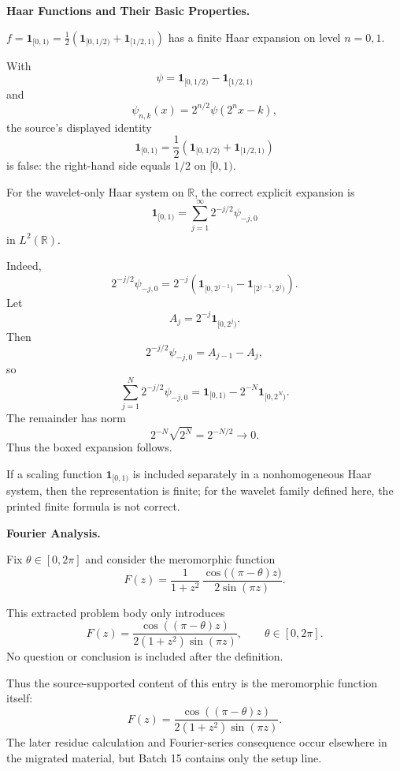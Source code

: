 \begin{problem}[CP-II-0389]
\label{prob:cp-ii-0389}
\textbf{Haar Functions and Their Basic Properties.}

\hspace*{1.5em}$f=\mathbf 1_{[0,1)}=\tfrac12(\mathbf 1_{[0,1/2)}+\mathbf 1_{[1/2,1)})$ has a finite Haar expansion on level $n=0,1$.
\end{problem}

\begin{solution}
With
\[
\psi
=
\mathbf1_{[0,1/2)}
-
\mathbf1_{[1/2,1)}
\]
and
\[
\psi_{n,k}(x)=2^{n/2}\psi(2^nx-k),
\]
the source's displayed identity
\[
\mathbf1_{[0,1)}
=
\frac12
\left(
\mathbf1_{[0,1/2)}
+
\mathbf1_{[1/2,1)}
\right)
\]
is false: the right-hand side equals \(1/2\) on \([0,1)\).

For the wavelet-only Haar system on \(\mathbb R\), the correct explicit expansion is
\[
\boxed{
\mathbf1_{[0,1)}
=
\sum_{j=1}^{\infty}
2^{-j/2}\psi_{-j,0}
}
\]
in \(L^2(\mathbb R)\).

Indeed,
\[
2^{-j/2}\psi_{-j,0}
=
2^{-j}
\left(
\mathbf1_{[0,2^{j-1})}
-
\mathbf1_{[2^{j-1},2^j)}
\right).
\]
Let
\[
A_j=2^{-j}\mathbf1_{[0,2^j)}.
\]
Then
\[
2^{-j/2}\psi_{-j,0}=A_{j-1}-A_j,
\]
so
\[
\sum_{j=1}^{N}2^{-j/2}\psi_{-j,0}
=
\mathbf1_{[0,1)}
-
2^{-N}\mathbf1_{[0,2^N)}.
\]
The remainder has norm
\[
2^{-N}\sqrt{2^N}=2^{-N/2}\to0.
\]
Thus the boxed expansion follows.

If a scaling function \(\mathbf1_{[0,1)}\) is included separately in a nonhomogeneous Haar
system, then the representation is finite; for the wavelet family defined here, the printed
finite formula is not correct.
\end{solution}


\begin{problem}[CP-II-0390]
\label{prob:cp-ii-0390}
\textbf{Fourier Analysis.}

\hspace*{1.5em}Fix $\theta\in[0,2\pi]$ and consider the meromorphic function
\[
F(z) = \frac{1}{1+z^2}\,\frac{\cos\bigl((\pi-\theta)z\bigr)}{2\sin(\pi z)}.
\]
\end{problem}

\begin{solution}
This extracted problem body only introduces
\[
F(z)
=
\frac{\cos((\pi-\theta)z)}
{2(1+z^2)\sin(\pi z)},
\qquad
\theta\in[0,2\pi].
\]
No question or conclusion is included after the definition.

Thus the source-supported content of this entry is the meromorphic function itself:
\[
\boxed{
F(z)
=
\frac{\cos((\pi-\theta)z)}
{2(1+z^2)\sin(\pi z)}.
}
\]
The later residue calculation and Fourier-series consequence occur elsewhere in the migrated
material, but Batch 15 contains only the setup line.
\end{solution}


